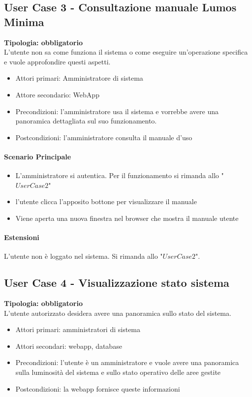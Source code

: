 \documentclass[12pt]{article}
\begin{document}
\subsection{User Case 3 - Consultazione manuale Lumos Minima}
\textbf{Tipologia: obbligatorio}\\
L'utente non sa come funziona il sistema o come eseguire un'operazione specifica e vuole approfondire questi aspetti.
\begin{itemize}
	\item Attori primari: Amministratore di sistema
	\item Attore secondario: WebApp
	\item Precondizioni: l'amministratore usa il sistema e vorrebbe avere una panoramica dettagliata sul suo funzionamento.
	\item Postcondizioni: l'amministratore consulta il manuale d'uso
\end{itemize}
\paragraph{Scenario Principale}
\begin{itemize}
	\item L'amministratore si autentica. Per il funzionamento si rimanda allo "$User Case 2$"
	\item l'utente clicca l'apposito bottone per visualizzare il manuale
	\item Viene aperta una nuova finestra nel browser che mostra il manuale utente
\end{itemize}

\paragraph{Estensioni} L'utente non è loggato nel sistema. Si rimanda allo "$User Case 2$".

\subsection{User Case 4 - Visualizzazione stato sistema}
\textbf{Tipologia: obbligatorio} \\
L'utente autorizzato desidera avere una panoramica sullo stato del sistema.
\begin{itemize}
	\item Attori primari: amministratori di sistema
	\item Attori secondari: webapp, database
	\item Precondizioni: l'utente è un amministratore e vuole avere una panoramica sulla luminosità del sistema e sullo stato operativo delle aree gestite
	\item Postcondizioni: la webapp fornisce queste informazioni
\end{itemize}
\end{document}
